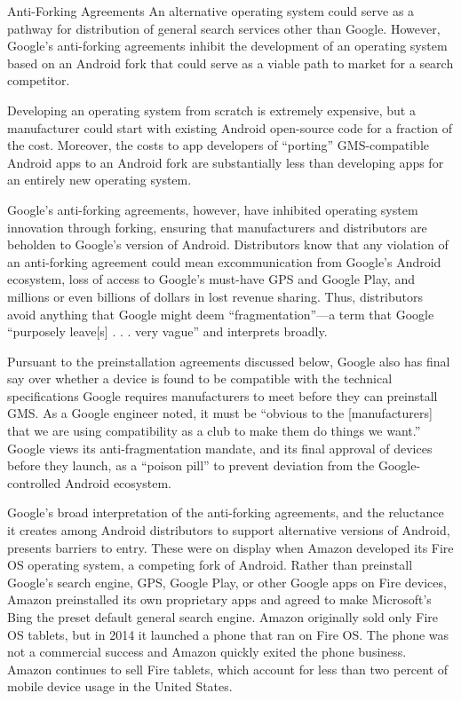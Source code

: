 \documentclass[11pt,b5paper]{scrartcl}
\begin{document}

Anti-Forking Agreements
An alternative operating system could serve as a pathway for distribution of
general search services other than Google. However, Google’s anti-forking agreements inhibit
the development of an operating system based on an Android fork that could serve as a viable
path to market for a search competitor.


Developing an operating system from scratch is extremely expensive, but a
manufacturer could start with existing Android open-source code for a fraction of the cost.
Moreover, the costs to app developers of “porting” GMS-compatible Android apps to an Android
fork are substantially less than developing apps for an entirely new operating system.


Google’s anti-forking agreements, however, have inhibited operating system
innovation through forking, ensuring that manufacturers and distributors are beholden to
Google’s version of Android. Distributors know that any violation of an anti-forking agreement
could mean excommunication from Google’s Android ecosystem, loss of access to Google’s
must-have GPS and Google Play, and millions or even billions of dollars in lost revenue sharing.
Thus, distributors avoid anything that Google might deem “fragmentation”—a term that Google
“purposely leave[s] . . . very vague” and interprets broadly.


Pursuant to the preinstallation agreements discussed below, Google also has final
say over whether a device is found to be compatible with the technical specifications Google
requires manufacturers to meet before they can preinstall GMS. As a Google engineer noted, it
must be “obvious to the [manufacturers] that we are using compatibility as a club to make them
do things we want.” Google views its anti-fragmentation mandate, and its final approval of
devices before they launch, as a “poison pill” to prevent deviation from the Google-controlled
Android ecosystem.


Google’s broad interpretation of the anti-forking agreements, and the reluctance it
creates among Android distributors to support alternative versions of Android, presents barriers
to entry. These were on display when Amazon developed its Fire OS operating system, a
competing fork of Android. Rather than preinstall Google’s search engine, GPS, Google Play, or
other Google apps on Fire devices, Amazon preinstalled its own proprietary apps and agreed to
make Microsoft’s Bing the preset default general search engine. Amazon originally sold only
Fire OS tablets, but in 2014 it launched a phone that ran on Fire OS. The phone was not a
commercial success and Amazon quickly exited the phone business. Amazon continues to sell
Fire tablets, which account for less than two percent of mobile device usage in the United States.
\end{document}
